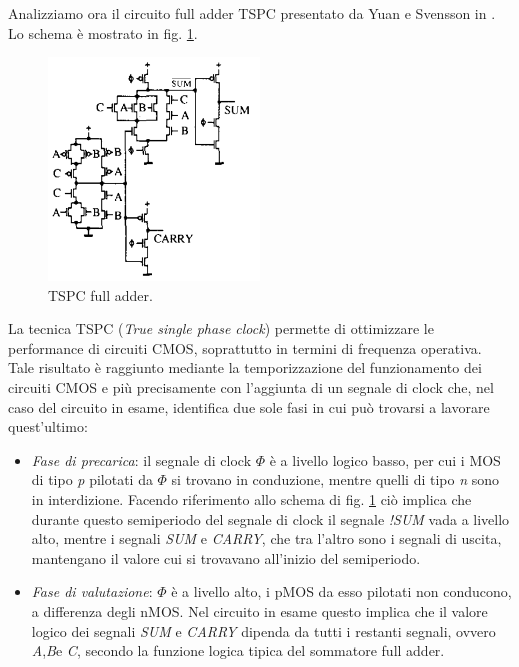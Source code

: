 Analizziamo ora il circuito full adder TSPC presentato da Yuan e Svensson in \cite{yuan1989high}. Lo schema è mostrato in fig. \ref{fig:fig_schemaDaArticolo}.

\begin{figure}[hbt!]
	\centering
	\includegraphics[width=0.5\textwidth]{figure/SchemaFullAdderTSPC_DaArticolo.PNG}
	\caption{TSPC full adder.}
	\label{fig:fig_schemaDaArticolo}
\end{figure}

La tecnica TSPC (\textit{True single phase clock}) permette di ottimizzare le performance di circuiti CMOS, soprattutto in termini di frequenza operativa. Tale risultato è raggiunto mediante la temporizzazione del funzionamento dei circuiti CMOS e più precisamente con l'aggiunta di un segnale di clock che, nel caso del circuito in esame, identifica due sole fasi in cui può trovarsi a lavorare quest'ultimo:

\begin{itemize}
	\item \textit{Fase di precarica}: il segnale di clock $\Phi$ è a livello logico basso, per cui i MOS di tipo \textit{p} pilotati da $\Phi$ si trovano in conduzione, mentre quelli di tipo \textit{n} sono in interdizione. Facendo riferimento allo schema di fig.  \ref{fig:fig_schemaDaArticolo} ciò implica che durante questo semiperiodo del segnale di clock il segnale \textit{!SUM} vada a livello alto, mentre i segnali \textit{SUM} e \textit{CARRY}, che tra l'altro sono i segnali di uscita, mantengano il valore cui si trovavano all'inizio del semiperiodo. 
	\item \textit{Fase di valutazione}: $\Phi$ è a livello alto, i pMOS da esso pilotati non conducono, a differenza degli nMOS. Nel circuito in esame questo implica che il valore logico dei segnali \textit{SUM} e \textit{CARRY} dipenda da tutti i restanti segnali, ovvero \textit{A},\textit{B}e \textit{C}, secondo la funzione logica tipica del sommatore full adder.
\end{itemize}

